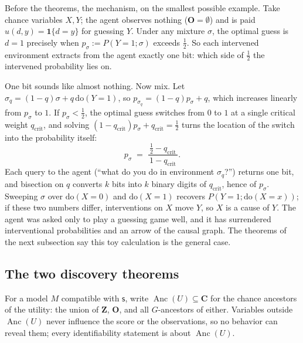 \documentclass[11pt]{amsart}
\theoremstyle{plain}
\theoremstyle{definition}
\DeclareMathOperator{\Anc}{Anc}
\newcommand{\bC}{\mathbf{C}}
\newcommand{\bO}{\mathbf{O}}
\newcommand{\bZ}{\mathbf{Z}}
\newcommand{\sk}{\mathsf{s}}
\begin{document}
Before the theorems, the mechanism, on the smallest possible example. Take chance variables $X,Y$; the agent observes nothing ($\bO=\emptyset$) and is paid $u(d,y)=\mathbf{1}\{d=y\}$ for guessing $Y$. Under any mixture $\sigma$, the optimal guess is $d=1$ precisely when $p_\sigma:=P(Y\!=\!1;\sigma)$ exceeds $\tfrac12$. So each intervened environment extracts from the agent exactly one bit: which side of $\tfrac12$ the intervened probability lies on.

One bit sounds like almost nothing. Now mix. Let $\sigma_q=(1-q)\sigma+q\,\mathrm{do}(Y\!=\!1)$, so $p_{\sigma_q}=(1-q)p_\sigma+q$, which increases linearly from $p_\sigma$ to $1$. If $p_\sigma<\tfrac12$, the optimal guess switches from $0$ to $1$ at a single critical weight $q_{\mathrm{crit}}$, and solving $(1-q_{\mathrm{crit}})p_\sigma+q_{\mathrm{crit}}=\tfrac12$ turns the location of the switch into the probability itself:
\[
   p_\sigma \;=\; \frac{\tfrac12-q_{\mathrm{crit}}}{\,1-q_{\mathrm{crit}}\,}.
\]
Each query to the agent (``what do you do in environment $\sigma_q$?'') returns one bit, and bisection on $q$ converts $k$ bits into $k$ binary digits of $q_{\mathrm{crit}}$, hence of $p_\sigma$. Sweeping $\sigma$ over $\mathrm{do}(X\!=\!0)$ and $\mathrm{do}(X\!=\!1)$ recovers $P(Y\!=\!1;\mathrm{do}(X\!=\!x))$; if these two numbers differ, interventions on $X$ move $Y$, so $X$ is a cause of $Y$. The agent was asked only to play a guessing game well, and it has surrendered interventional probabilities and an arrow of the causal graph. The theorems of the next subsection say this toy calculation is the general case.

\subsection{The two discovery theorems}\label{subsec:theorems}

For a model $M$ compatible with $\sk$, write $\Anc(U)\subseteq\bC$ for the chance ancestors of the utility: the union of $\bZ$, $\bO$, and all $G$-ancestors of either. Variables outside $\Anc(U)$ never influence the score or the observations, so no behavior can reveal them; every identifiability statement is about $\Anc(U)$.
\end{document}
